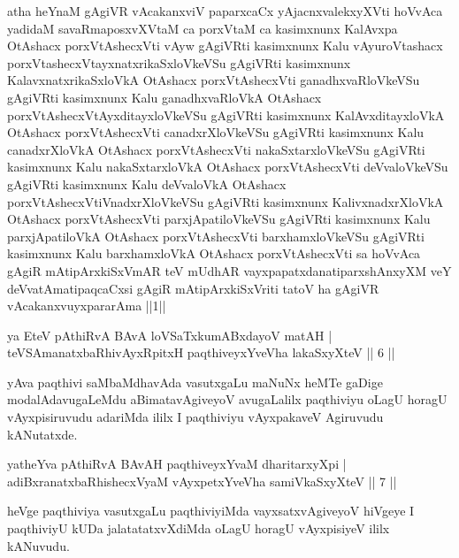\begin{shl}
atha heYnaM gAgiVR vAcakanxviV paparxcaCx yAjacnxvalekxyXVti hoVvAca yadidaM savaRmaposxvXVtaM ca porxVtaM ca kasimxnunx KalAvxpa OtAshacx porxVtAshecxVti vAyw gAgiVRti kasimxnunx Kalu vAyuroVtashacx porxVtashecxVtayxnatxrikaSxloVkeVSu gAgiVRti kasimxnunx KalavxnatxrikaSxloVkA OtAshacx porxVtAshecxVti ganadhxvaRloVkeVSu gAgiVRti kasimxnunx Kalu ganadhxvaRloVkA OtAshacx porxVtAshecxVtAyxditayxloVkeVSu gAgiVRti kasimxnunx KalAvxditayxloVkA OtAshacx porxVtAshecxVti canadxrXloVkeVSu gAgiVRti kasimxnunx Kalu canadxrXloVkA OtAshacx porxVtAshecxVti nakaSxtarxloVkeVSu gAgiVRti kasimxnunx Kalu nakaSxtarxloVkA OtAshacx porxVtAshecxVti deVvaloVkeVSu gAgiVRti kasimxnunx Kalu deVvaloVkA OtAshacx porxVtAshecxVtiVnadxrXloVkeVSu gAgiVRti kasimxnunx KalivxnadxrXloVkA OtAshacx porxVtAshecxVti parxjApatiloVkeVSu gAgiVRti kasimxnunx Kalu parxjApatiloVkA OtAshacx porxVtAshecxVti barxhamxloVkeVSu gAgiVRti kasimxnunx Kalu barxhamxloVkA OtAshacx porxVtAshecxVti sa hoVvAca gAgiR mAtipArxkiSxVmAR teV mUdhAR vayxpapatxdanatiparxshAnxyXM veY deVvatAmatipaqcaCxsi gAgiR mAtipArxkiSxVriti tatoV ha gAgiVR vAcakanxvuyxpararAma ||1||
\end{shl}


\begin{shl}
ya EteV pAthiRvA BAvA loVSaTxkumABxdayoV matAH |\\
teVSAmanatxbaRhivAyxRpitxH paqthiveyxYveVha lakaSxyXteV \hfill || 6 ||
\end{shl}

\begin{artha}
yAva paqthivi saMbaMdhavAda vasutxgaLu maNuNx heMTe gaDige modalAdavu\-gaLeMdu aBimatavAgiveyoV avugaLalilx paqthiviyu oLagU horagU vAyxpisiruvudu adariMda ililx I paqthiviyu vAyxpakaveV Agiruvudu kANutatxde. 
\end{artha}

\begin{shl}
yatheYva pAthiRvA BAvAH paqthiveyxYvaM dharitarxyXpi |\\
adiBxranatxbaRhishecxVyaM vAyxpetxYveVha samiVkaSxyXteV \hfill || 7 ||
\end{shl}

\begin{artha}
heVge paqthiviya vasutxgaLu paqthiviyiMda vayxsatxvAgiveyoV hiVgeye I paqthiviyU kUDa jalatatatxvXdiMda oLagU horagU vAyxpisiyeV ililx kANuvudu.
\end{artha}

